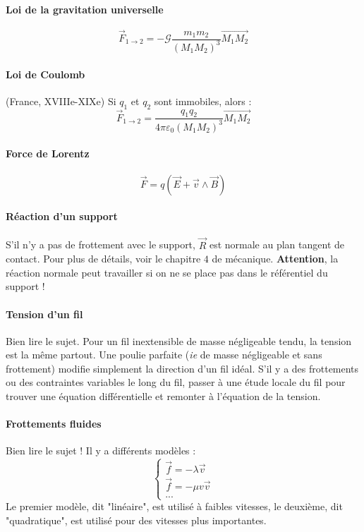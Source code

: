 \documentclass[french]{book}
\theoremstyle{plain}
\theoremstyle{definition}
\theoremstyle{remark}
\begin{document}
\paragraph{Loi de la gravitation universelle} $$\overrightarrow{F}_{1\to 2}=-\mathcal{G}\frac{m_1m_2}{(M_1M_2)^3}\overrightarrow{M_1M_2}$$
\paragraph{Loi de Coulomb} (France, XVIIIe-XIXe) Si $q_1$ et $q_2$ sont immobiles, alors : $$\overrightarrow{F}_{1\to 2}=\frac{q_1q_2}{4\pi\varepsilon_0(M_1M_2)^3}\overrightarrow{M_1M_2}$$
\paragraph{Force de Lorentz}$$\overrightarrow{F}=q\left(\overrightarrow{E}+\overrightarrow{v}\wedge\overrightarrow{B}\right)$$
\paragraph{Réaction d'un support} S'il n'y a pas de frottement avec le support, $\overrightarrow{R}$ est normale au plan tangent de contact. Pour plus de détails, voir le chapitre $4$ de mécanique. \textbf{Attention}, la réaction normale peut travailler si on ne se place pas dans le référentiel du support !
\paragraph{Tension d'un fil} Bien lire le sujet. Pour un fil inextensible de masse négligeable tendu, la tension est la même partout. Une poulie parfaite (\textit{ie} de masse négligeable et sans frottement) modifie simplement la direction d'un fil idéal. S'il y a des frottements ou des contraintes variables le long du fil, passer à une étude locale du fil pour trouver une équation différentielle et remonter à l'équation de la tension.
\paragraph{Frottements fluides} Bien lire le sujet ! Il y a différents modèles : $$\begin{cases}
	\overrightarrow{f}=-\lambda\overrightarrow{v} \\
	\overrightarrow{f}=-\mu v\overrightarrow{v} \\
	...
\end{cases}$$
Le premier modèle, dit "linéaire", est utilisé à faibles vitesses, le deuxième, dit "quadratique", est utilisé pour des vitesses plus importantes.
\end{document}
